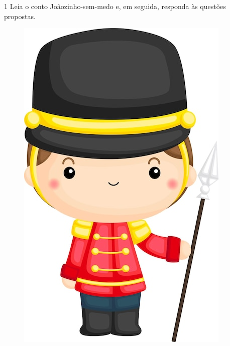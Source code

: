 \num{1} Leia o conto Joãozinho-sem-medo e, em seguida, responda às questões propostas.

\begin{figure}[htpb!]
\includegraphics[width=\textwidth]{media/image24.jpeg}
\end{figure}

